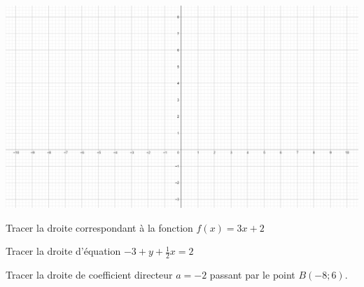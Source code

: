 \section{}


\begin{center}
	\includegraphics[scale=0.5]{vide}
\end{center}
\begin{questions}
	
	
	
	\question[2] Tracer la droite correspondant à la fonction $f(x) = 3x + 2$
	
	
	\fillwithdottedlines{3cm}
	
	\question[2]Tracer la droite d'équation $- 3 + y + \frac{1}{2}x = 2$
	\fillwithdottedlines{3cm}
	
	\question[2] Tracer la droite de coefficient directeur $a = -2$ passant par le point $B(-8; 6)$.
	
	
\end{questions}

\section{}

